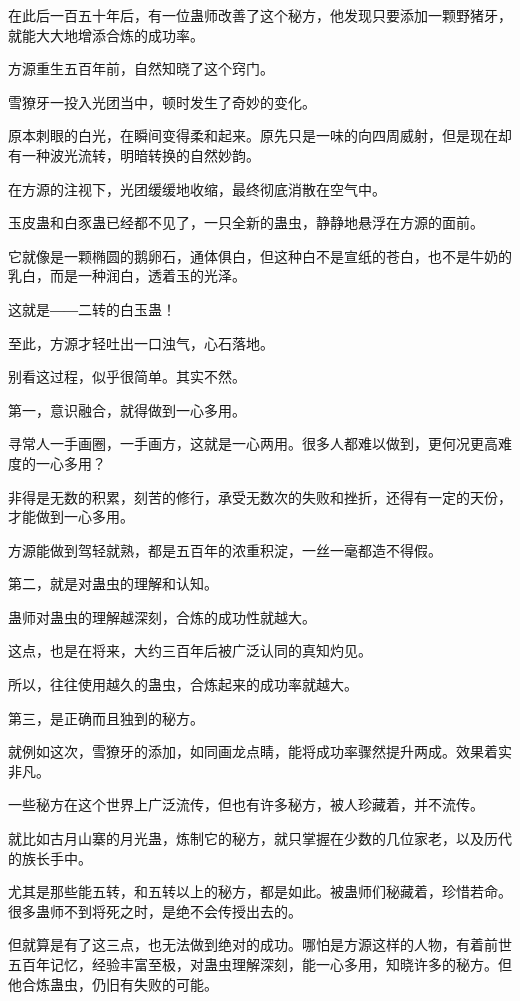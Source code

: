 \begin{this_body}
在此后一百五十年后，有一位蛊师改善了这个秘方，他发现只要添加一颗野猪牙，就能大大地增添合炼的成功率。

方源重生五百年前，自然知晓了这个窍门。

雪獠牙一投入光团当中，顿时发生了奇妙的变化。

原本刺眼的白光，在瞬间变得柔和起来。原先只是一味的向四周威射，但是现在却有一种波光流转，明暗转换的自然妙韵。

在方源的注视下，光团缓缓地收缩，最终彻底消散在空气中。

玉皮蛊和白豕蛊已经都不见了，一只全新的蛊虫，静静地悬浮在方源的面前。

它就像是一颗椭圆的鹅卵石，通体俱白，但这种白不是宣纸的苍白，也不是牛奶的乳白，而是一种润白，透着玉的光泽。

这就是――二转的白玉蛊！

至此，方源才轻吐出一口浊气，心石落地。

别看这过程，似乎很简单。其实不然。

第一，意识融合，就得做到一心多用。

寻常人一手画圈，一手画方，这就是一心两用。很多人都难以做到，更何况更高难度的一心多用？

非得是无数的积累，刻苦的修行，承受无数次的失败和挫折，还得有一定的天份，才能做到一心多用。

方源能做到驾轻就熟，都是五百年的浓重积淀，一丝一毫都造不得假。

第二，就是对蛊虫的理解和认知。

蛊师对蛊虫的理解越深刻，合炼的成功性就越大。

这点，也是在将来，大约三百年后被广泛认同的真知灼见。

所以，往往使用越久的蛊虫，合炼起来的成功率就越大。

第三，是正确而且独到的秘方。

就例如这次，雪獠牙的添加，如同画龙点睛，能将成功率骤然提升两成。效果着实非凡。

一些秘方在这个世界上广泛流传，但也有许多秘方，被人珍藏着，并不流传。

就比如古月山寨的月光蛊，炼制它的秘方，就只掌握在少数的几位家老，以及历代的族长手中。

尤其是那些能五转，和五转以上的秘方，都是如此。被蛊师们秘藏着，珍惜若命。很多蛊师不到将死之时，是绝不会传授出去的。

但就算是有了这三点，也无法做到绝对的成功。哪怕是方源这样的人物，有着前世五百年记忆，经验丰富至极，对蛊虫理解深刻，能一心多用，知晓许多的秘方。但他合炼蛊虫，仍旧有失败的可能。


\end{this_body}
